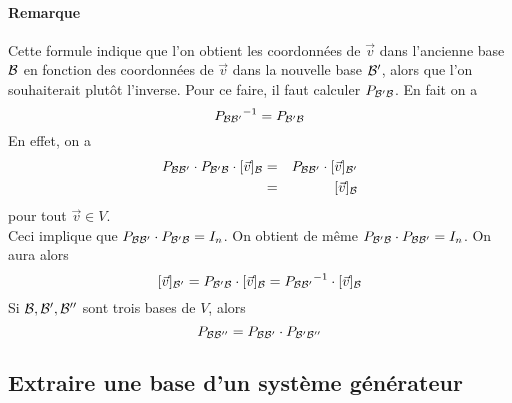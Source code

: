 \paragraph{Remarque} Cette formule indique que l'on obtient les coordonnées de $\vec{v}$ dans l'ancienne base $\mathcal{B}$ en fonction des coordonnées de $\vec{v}$ dans la nouvelle base $\mathcal{B}'$, alors que l'on souhaiterait plutôt l'inverse. Pour ce faire, il faut calculer $P_{\mathcal{B}' \mathcal{B}}$. En fait on a
$${P_{\mathcal{B} \mathcal{B}'}}^{-1} = P_{\mathcal{B}' \mathcal{B}}$$
En effet, on a
\begin{eqnarray*}
  P_{\mathcal{B} \mathcal{B}'} \cdot P_{\mathcal{B}' \mathcal{B}} \cdot [\vec{v}]_{\mathcal{B}} &=& P_{\mathcal{B} \mathcal{B}'} \cdot [\vec{v}]_{\mathcal{B}'} \\
   &=& [\vec{v}]_{\mathcal{B}}
\end{eqnarray*}
pour tout $\vec{v} \in V$. \\
Ceci implique que $P_{\mathcal{B} \mathcal{B}'} \cdot P_{\mathcal{B}' \mathcal{B}} = I_n$. On obtient de même $P_{\mathcal{B}' \mathcal{B}} \cdot P_{\mathcal{B} \mathcal{B}'} = I_n$. On aura alors
$$[\vec{v}]_{\mathcal{B}'} = P_{\mathcal{B}' \mathcal{B}} \cdot [\vec{v}]_{\mathcal{B}} = {P_{\mathcal{B} \mathcal{B}'}}^{-1} \cdot [\vec{v}]_{\mathcal{B}}$$
Si $\mathcal{B}, \mathcal{B}', \mathcal{B}''$ sont trois bases de $V$, alors
$$P_{\mathcal{B} \mathcal{B}''} = P_{\mathcal{B} \mathcal{B}'} \cdot P_{\mathcal{B}' \mathcal{B}''}$$

%
\subsection{Extraire une base d'un système générateur}
%
